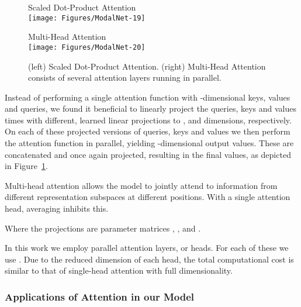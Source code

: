 \documentclass{article}
\begin{document}
\begin{figure}
\begin{minipage}[t]{0.5\textwidth}
  \centering
  Scaled Dot-Product Attention \\
  \vspace{0.5cm}
  \texttt{[image: Figures/ModalNet-19]}
\end{minipage}
\begin{minipage}[t]{0.5\textwidth}
  \centering 
  Multi-Head Attention \\
  \vspace{0.1cm}
  \texttt{[image: Figures/ModalNet-20]}  
\end{minipage}




  \caption{(left) Scaled Dot-Product Attention. (right) Multi-Head Attention consists of several attention layers running in parallel.}
  \label{fig:multi-head-att}
\end{figure}

Instead of performing a single attention function with -dimensional keys, values and queries, we found it beneficial to linearly project the queries, keys and values  times with different, learned linear projections to ,  and  dimensions, respectively.
On each of these projected versions of queries, keys and values we then perform the attention function in parallel, yielding -dimensional output values. These are concatenated and once again projected, resulting in the final values, as depicted in Figure~\ref{fig:multi-head-att}.

Multi-head attention allows the model to jointly attend to information from different representation subspaces at different positions. With a single attention head, averaging inhibits this.



Where the projections are parameter matrices , ,  and .




In this work we employ  parallel attention layers, or heads. For each of these we use .
Due to the reduced dimension of each head, the total computational cost is similar to that of single-head attention with full dimensionality.

\subsubsection{Applications of Attention in our Model}
\end{document}
